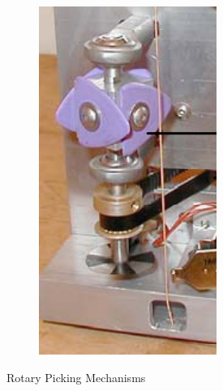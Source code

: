 \documentclass[12pt, a4paper, onecolumn]{IEEEtran}
\begin{document}
\begin{figure}[!h]
\begin{subfigure}{0.2\textwidth}
                \includegraphics[width=\columnwidth]{guitarbot_picking.png}
                \label{fig:guitarbot_picking}
            \end{subfigure}
            \caption{Rotary Picking Mechanisms}
            \label{fig:RotaryPicking}
        \end{figure}
\end{document}
